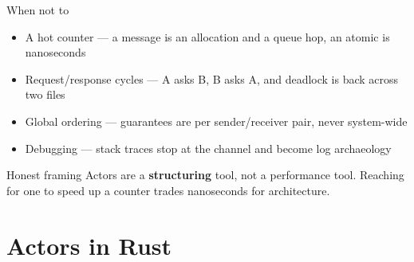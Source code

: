 \begin{frame}{When not to}
  \begin{itemize}
    \item A hot counter --- a message is an allocation and a queue hop, an atomic is nanoseconds
    \item Request/response cycles --- A asks B, B asks A, and deadlock is back across two files
    \item Global ordering --- guarantees are per sender/receiver pair, never system-wide
    \item Debugging --- stack traces stop at the channel and become log archaeology
  \end{itemize}
  \vspace{0.2cm}
  \begin{alertblock}{Honest framing}
    Actors are a \textbf{structuring} tool, not a performance tool. Reaching for
    one to speed up a counter trades nanoseconds for architecture.
  \end{alertblock}
\end{frame}

\section{Actors in Rust}

